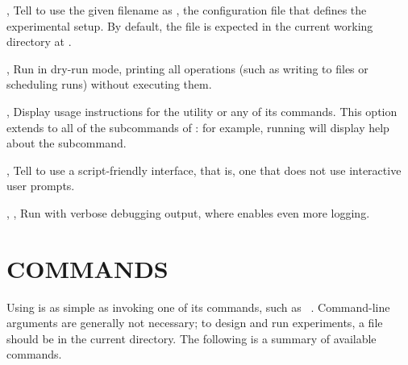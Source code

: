 \documentclass[a4paper,english]{article}
\begin{document}
\begin{adjustwidth}{18pt}{0pt}
        \begin{Description}[Options]
            \item[\OptArg{-c}{ filename}, \OptArg{\ddash config}{ filename}]
            Tell  to use the given filename as , the configuration
            file that defines the experimental setup.
            By default, the file is expected in the current working directory at .
            \item[\Opt{-d}, \Opt{\ddash dry-run}]
            Run  in dry-run mode, printing all operations (such as writing to files or scheduling runs)
            without executing them.
            \item[\Opt{-h}, \Opt{\ddash help}]
            Display usage instructions for the  utility or any of its commands.
            This option extends to all of the subcommands of : for example, running
               will display help about the  subcommand.
            \item[\Opt{-s}, \Opt{\ddash script}]
            Tell  to use a script-friendly interface, that is, one that does not use
            interactive user prompts.
            \item[\Opt{-v}, \Opt{-vv}, \Opt{\ddash verbose}]
            Run  with verbose debugging output, where  enables even more logging.
        \end{Description}

    \section{COMMANDS}

        Using  is as simple as invoking one of its commands, such as
        ~.
        Command-line arguments are generally not necessary; to design and run
        experiments, a  file should be in the current directory.
        The following is a summary of available commands.


\end{adjustwidth}
\end{document}
